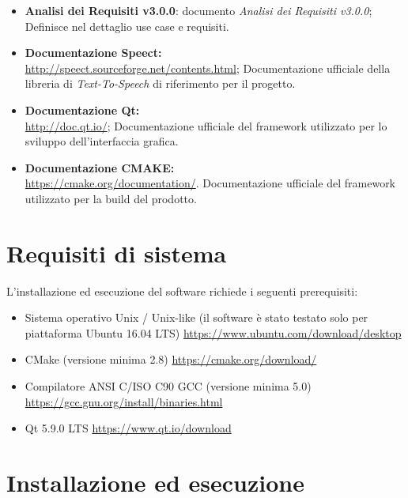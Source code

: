 \documentclass[openany,12pt,a4paper]{report}
\begin{document}
	\begin{itemize}
		\item \textbf{Analisi dei Requisiti v3.0.0}: documento \textit{Analisi dei Requisiti v3.0.0};
		\subitem Definisce nel dettaglio use case e requisiti.
		
		\item \textbf{Documentazione Speect:} \\
		\url{http://speect.sourceforge.net/contents.html};
		\subitem Documentazione ufficiale della libreria di \textit{Text-To-Speech} di riferimento per il progetto.
		
		\item \textbf{Documentazione Qt:} \\
		\url{http://doc.qt.io/};
		\subitem Documentazione ufficiale del framework utilizzato per lo sviluppo dell'interfaccia grafica.
		
		\item \textbf{Documentazione CMAKE:} \\
		\url{https://cmake.org/documentation/}.
		\subitem Documentazione ufficiale del framework utilizzato per la build del prodotto. 
	\end{itemize}

	\chapter{Requisiti di sistema}
	
	L'installazione ed esecuzione del software richiede i seguenti prerequisiti:
	
	\begin{itemize}
		\item Sistema operativo Unix / Unix-like (il software è stato testato solo per piattaforma Ubuntu 16.04 LTS)
		\subitem \url{https://www.ubuntu.com/download/desktop}
		\item CMake (versione minima 2.8)
		\subitem \url{https://cmake.org/download/}
		\item Compilatore ANSI C/ISO C90 GCC (versione minima 5.0)
		\subitem \url{https://gcc.gnu.org/install/binaries.html}
		\item Qt 5.9.0 LTS
		\subitem \url{https://www.qt.io/download}
	\end{itemize}

	\chapter{Installazione ed esecuzione}
	
\end{document}
